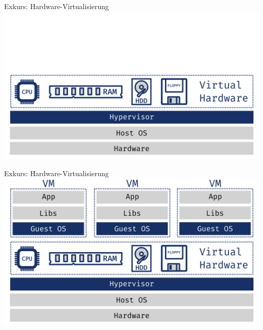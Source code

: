 \documentclass{beamer}
\begin{document}
  \begin{frame}{Exkurs: Hardware-Virtualisierung}
    \includegraphics[width=\textwidth]{hypervisor}
  \end{frame}
  \begin{frame}{Exkurs: Hardware-Virtualisierung}
    \includegraphics[width=\textwidth]{vms}
  \end{frame}
  
\end{document}
